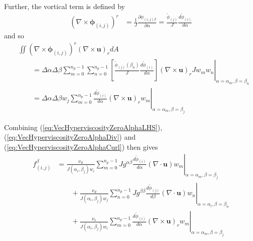 \documentclass{article}
\newcommand{\vb}{\mathbf}
\newcommand{\vg}{\boldsymbol}
\newcommand{\diff}[2]{\frac{d #1}{d #2}}
\newcommand{\pdiff}[2]{\frac{\partial #1}{\partial #2}}
\begin{document}
Further, the vortical term is defined by
\begin{align}
(\nabla \times \vg{\phi}_{(i,j)})^r &= \frac{1}{J} \pdiff{\phi_{(i,j) \beta}}{\alpha} = \frac{\tilde{\phi}_{(j)}}{J} \diff{\tilde{\phi}_{(i)}}{\alpha}
\end{align} and so
\begin{align}
& \iint (\nabla \times \vg{\phi}_{(i,j)})^r (\nabla \times \vb{u})_r dA \nonumber \\
& \qquad = \Delta \alpha \Delta \beta \sum_{m=0}^{n_p-1} \sum_{n=0}^{n_p-1} \left. \left[\frac{\tilde{\phi}_{(j)}(\beta_n)}{J} \diff{\tilde{\phi}_{(i)}}{\alpha}\right] (\nabla \times \vb{u})_r J w_m w_n \right\vert_{\alpha = \alpha_m, \beta = \beta_n} \\
& \qquad = \Delta \alpha \Delta \beta w_j \sum_{m=0}^{n_p-1} \left. \diff{\tilde{\phi}_{(i)}}{\alpha} (\nabla \times \vb{u})_r w_m \right\vert_{\alpha = \alpha_m, \beta = \beta_j} \label{eq:VecHyperviscosityZeroAlphaCurl}
\end{align}

Combining (\ref{eq:VecHyperviscosityZeroAlphaLHS}), (\ref{eq:VecHyperviscosityZeroAlphaDiv}) and (\ref{eq:VecHyperviscosityZeroAlphaCurl}) then gives
\begin{align}
f^{\beta}_{(i,j)} &= \frac{\nu_d}{J(\alpha_i, \beta_j) w_i} \sum_{m=0}^{n_p-1} \left. J g^{\alpha \beta} \diff{\tilde{\phi}_{(i)}}{\alpha} (\nabla \cdot \vb{u}) w_m \right\vert_{\alpha = \alpha_m, \beta = \beta_j} \nonumber \\
& \qquad + \frac{\nu_d}{J(\alpha_i, \beta_j) w_j} \sum_{n=0}^{n_p-1} \left. J g^{\beta \beta} \diff{\tilde{\phi}_{(j)}}{\beta} (\nabla \cdot \vb{u}) w_n \right\vert_{\alpha = \alpha_i, \beta = \beta_n} \nonumber \\
& \qquad + \frac{\nu_v}{J(\alpha_i, \beta_j) w_i} \sum_{m=0}^{n_p-1} \left. \diff{\tilde{\phi}_{(i)}}{\alpha} (\nabla \times \vb{u})_r w_m \right\vert_{\alpha = \alpha_m, \beta = \beta_j}
\end{align}
\end{document}
